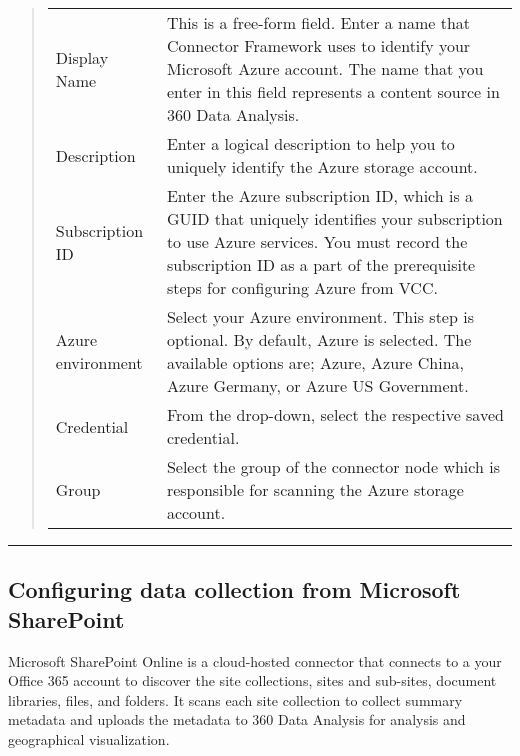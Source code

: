 \documentclass[letterpaper,10pt,english]{sphinxmanual}
\begin{document}
\begin{quote}


\begin{savenotes}\sphinxattablestart
\centering
\begin{tabulary}{\linewidth}[t]{|T|T|}
\hline
{}\relax &\relax \\
\hline
Display Name
&
This is a free-form field. Enter a name that Connector Framework uses
to identify your Microsoft Azure account.
The name that you enter in this field represents a content
source in 360 Data Analysis.
\\
\hline
Description
&
Enter a logical description to help you to uniquely identify the Azure
storage account.
\\
\hline
Subscription ID
&
Enter the Azure subscription ID, which is a GUID that uniquely
identifies your subscription to use Azure services.
You must record the subscription ID as a part of the prerequisite
steps for configuring Azure from VCC.
\\
\hline
Azure environment
&
Select your Azure environment. This step is optional. By default, Azure
is selected.
The available options are; Azure, Azure China, Azure
Germany, or Azure US Government.
\\
\hline
Credential
&
From the drop-down, select the respective saved credential.
\\
\hline
Group
&
Select the group of the connector node which is responsible for
scanning the Azure storage account.
\\
\hline
\end{tabulary}
\par
\sphinxattableend\end{savenotes}
\end{quote}


\bigskip\hrule\bigskip



\subsection{Configuring data collection from Microsoft SharePoint}
\label{\detokenize{mcdmp_app_ug:configuring-data-collection-from-microsoft-sharepoint}}
Microsoft SharePoint Online is a cloud-hosted connector that connects to a your Office 365 account to discover the site collections, sites and sub-sites, document libraries, files, and folders. It scans each site collection to collect summary metadata and uploads the metadata to 360 Data Analysis for analysis and geographical
visualization.
\end{document}
